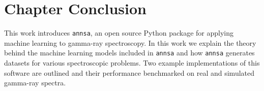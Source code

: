 
\section{Chapter Conclusion}

This work introduces \verb|annsa|, an open source Python package for applying machine learning to gamma-ray spectroscopy. In this work we explain the theory behind the machine learning models included in \verb|annsa| and how \verb|annsa| generates datasets for various spectroscopic problems. Two example implementations of this software are outlined and their performance benchmarked on real and simulated gamma-ray spectra.


